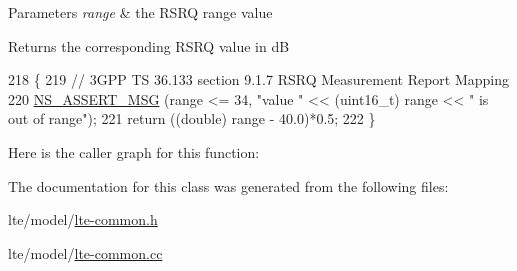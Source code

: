 \begin{DoxyParams}{Parameters}
{\em range} & the R\+S\+RQ range value\\
\hline
\end{DoxyParams}
\begin{DoxyReturn}{Returns}
the corresponding R\+S\+RQ value in dB 
\end{DoxyReturn}

\begin{DoxyCode}
218 \{
219   \textcolor{comment}{// 3GPP TS 36.133 section 9.1.7 RSRQ Measurement Report Mapping}
220   \hyperlink{assert_8h_aff5ece9066c74e681e74999856f08539}{NS\_ASSERT\_MSG} (range <= 34, \textcolor{stringliteral}{"value "} << (uint16\_t) range << \textcolor{stringliteral}{" is out of range"});
221   \textcolor{keywordflow}{return} ((\textcolor{keywordtype}{double}) range - 40.0)*0.5;
222 \}
\end{DoxyCode}


Here is the caller graph for this function\+:




The documentation for this class was generated from the following files\+:\begin{DoxyCompactItemize}
\item 
lte/model/\hyperlink{lte-common_8h}{lte-\/common.\+h}\item 
lte/model/\hyperlink{lte-common_8cc}{lte-\/common.\+cc}\end{DoxyCompactItemize}
